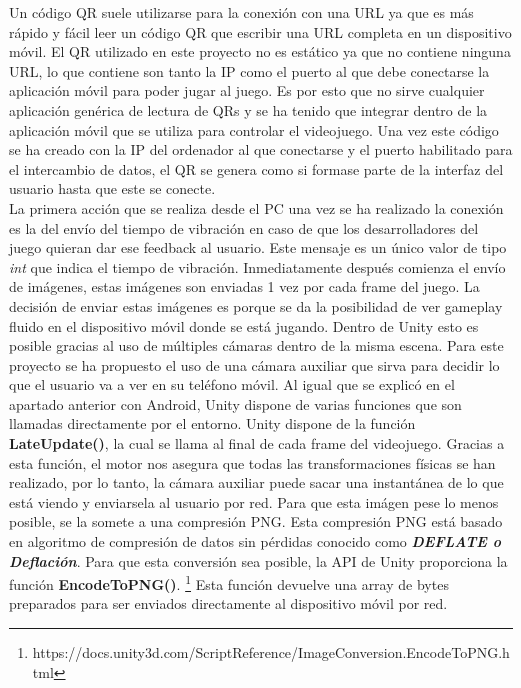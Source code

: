 Un c\'odigo QR suele utilizarse para la conexi\'on con una URL ya que es m\'as r\'apido y f\'acil leer un c\'odigo QR que escribir una URL completa en un dispositivo m\'ovil. El QR utilizado en este proyecto no es est\'atico ya que no contiene ninguna URL, lo que contiene son tanto la IP como el puerto al que debe conectarse la aplicaci\'on m\'ovil para poder jugar al juego. Es por esto que no sirve cualquier aplicaci\'on gen\'erica de lectura de QRs y se ha tenido que integrar dentro de la aplicaci\'on m\'ovil que se utiliza para controlar el videojuego. Una vez este c\'odigo se ha creado con la IP del ordenador al que conectarse y el puerto habilitado para el intercambio de datos, el QR se genera como si formase parte de la interfaz del usuario hasta que este se conecte.
\\
La primera acci\'on que se realiza desde el PC una vez se ha realizado la conexi\'on es la del env\'io del tiempo de vibraci\'on en caso de que los desarrolladores del juego quieran dar ese feedback al usuario. Este mensaje es un \'unico valor de tipo \textit{int} que indica el tiempo de vibraci\'on. Inmediatamente despu\'es comienza el env\'io de im\'agenes, estas im\'agenes son enviadas 1 vez por cada frame del juego. La decisi\'on de enviar estas im\'agenes es porque se da la posibilidad de ver gameplay fluido en el dispositivo m\'ovil donde se est\'a jugando. Dentro de Unity esto es posible gracias al uso de m\'ultiples c\'amaras dentro de la misma escena. Para este proyecto se ha propuesto el uso de una c\'amara auxiliar que sirva para decidir lo que el usuario va a ver en su tel\'efono m\'ovil. Al igual que se explic\'o en el apartado anterior con Android, Unity dispone de varias funciones que son llamadas directamente por el entorno. Unity dispone de la funci\'on \textbf{LateUpdate()}, la cual se llama al final de cada frame del videojuego. Gracias a esta funci\'on, el motor nos asegura que todas las transformaciones f\'isicas se han realizado, por lo tanto,  la c\'amara auxiliar puede sacar una instant\'anea de lo que est\'a viendo y enviarsela al usuario por red. Para que esta im\'agen pese lo menos posible, se la somete a una compresi\'on PNG. Esta compresi\'on PNG est\'a basado en algoritmo de compresi\'on de datos sin p\'erdidas conocido como \textbf{\textit{DEFLATE o Deflaci\'on}}. Para que esta conversi\'on sea posible, la API de Unity proporciona la funci\'on \textbf{EncodeToPNG()}. \footnote{https://docs.unity3d.com/ScriptReference/ImageConversion.EncodeToPNG.html} Esta funci\'on devuelve una array de bytes preparados para ser enviados directamente al dispositivo m\'ovil por red.
